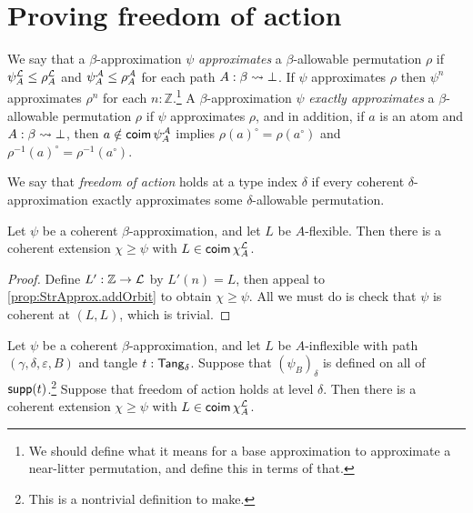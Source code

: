 \section{Proving freedom of action}
\begin{definition}[approximates]
  \label{def:StrApprox.Approximates}
  We say that a \( \beta \)-approximation \( \psi \) \emph{approximates} a \( \beta \)-allowable permutation \( \rho \) if \( \psi_A^{\mathcal L} \leq \rho_A^{\mathcal L} \) and \( \psi_A^{\mathcal A} \leq \rho_A^{\mathcal A} \) for each path \( A : \beta \rightsquigarrow \bot \).
  If \( \psi \) approximates \( \rho \) then \( \psi^n \) approximates \( \rho^n \) for each \( n : \mathbb Z \).\footnote{We should define what it means for a base approximation to approximate a near-litter permutation, and define this in terms of that.}
  A \( \beta \)-approximation \( \psi \) \emph{exactly approximates} a \( \beta \)-allowable permutation \( \rho \) if \( \psi \) approximates \( \rho \), and in addition, if \( a \) is an atom and \( A : \beta \rightsquigarrow \bot \), then \( a \notin \operatorname{\mathsf{coim}} \psi_A^{\mathcal A} \) implies \( \rho(a)^\circ = \rho(a^\circ) \) and \( \rho^{-1}(a)^\circ = \rho^{-1}(a^\circ) \).
\end{definition}
\begin{definition}
  \label{def:FreedomOfAction}
  We say that \emph{freedom of action} holds at a type index \( \delta \) if every coherent \( \delta \)-approximation exactly approximates some \( \delta \)-allowable permutation.
\end{definition}
\begin{proposition}
  \label{prop:StrApprox.addFlexible}
  Let \( \psi \) be a coherent \( \beta \)-approximation, and let \( L \) be \( A \)-flexible.
  Then there is a coherent extension \( \chi \geq \psi \) with \( L \in \operatorname{\mathsf{coim}} \chi_A^{\mathcal L} \).
\end{proposition}
\begin{proof}
  Define \( L' : \mathbb Z \to {\mathcal L} \) by \( L'(n) = L \), then appeal to \cref{prop:StrApprox.addOrbit} to obtain \( \chi \geq \psi \).
  All we must do is check that \( \psi \) is coherent at \( (L, L) \), which is trivial.
\end{proof}
\begin{proposition}
  \label{prop:StrApprox.addInflexible}
  Let \( \psi \) be a coherent \( \beta \)-approximation, and let \( L \) be \( A \)-inflexible with path \( (\gamma, \delta, \varepsilon, B) \) and tangle \( t : \mathsf{Tang}_\delta \).
  Suppose that \( (\psi_B)_\delta \) is defined on all of \( \operatorname{\mathsf{supp}}(t) \).\footnote{This is a nontrivial definition to make.}
  Suppose that freedom of action holds at level \( \delta \).
  Then there is a coherent extension \( \chi \geq \psi \) with \( L \in \operatorname{\mathsf{coim}} \chi_A^{\mathcal L} \).
\end{proposition}
